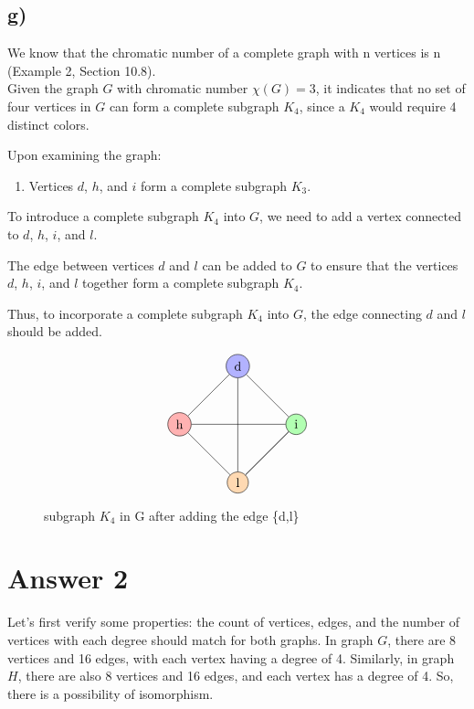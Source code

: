 \documentclass[12pt]{article}
\begin{document}
\subsection*{g)}

We know that the chromatic number of a complete graph with n vertices is n (Example 2, Section 10.8).\\
Given the graph \( G \) with chromatic number \( \chi(G) = 3 \), it indicates that no set of four vertices in \( G \) can form a complete subgraph \( K_4 \), since a \( K_4 \) would require 4 distinct colors.

Upon examining the graph:

\begin{enumerate}
    \item Vertices \( d \), \( h \), and \( i \) form a complete subgraph \( K_3 \).
\end{enumerate}

To introduce a complete subgraph \( K_4 \) into \( G \), we need to add a vertex connected to \( d \), \( h \), \( i \), and \( l \).

The edge between vertices \( d \) and \( l \) can be added to \( G \) to ensure that the vertices \( d \), \( h \), \( i \), and \( l \) together form a complete subgraph \( K_4 \).

Thus, to incorporate a complete subgraph \( K_4 \) into \( G \), the edge connecting \( d \) and \( l \) should be added.

\begin{figure}[H] 
    \[
\begin{tikzpicture}[scale=0.8]

    \node[circle,draw,fill=blue!30] (d) at (0,2) {d};
    \node[circle,draw,fill=red!30] (h) at (-2,0) {h};
    \node[circle,draw,fill=green!30] (i) at (2,0) {i};
    \node[circle,draw,fill=orange!30] (l) at (0,-2) {l};

    \draw (d) -- (h) -- (l) -- (i) -- (d) -- (l) -- (i) -- (h);

\end{tikzpicture}
\]
\caption{subgraph \(K_4\) in G after adding the edge \{d,l\}}
\end{figure}

\section*{Answer 2}

Let's first verify some properties: the count of vertices, edges, and the number of vertices with each degree should match for both graphs. In graph \( G \), there are 8 vertices and 16 edges, with each vertex having a degree of 4. Similarly, in graph \( H \), there are also 8 vertices and 16 edges, and each vertex has a degree of 4. So, there is a possibility of isomorphism.
\end{document}
